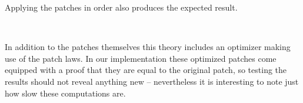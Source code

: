 Applying the patches in order also produces the expected result.
\begin{code}%
%
\>[2]\AgdaFunction{\AgdaUnderscore{}}\AgdaSpace{}%
\AgdaSymbol{:}\AgdaSpace{}%
\AgdaSpace{}%
\AgdaSpace{}%
\AgdaSymbol{(}\AgdaSpace{}%
\AgdaSpace{}%
\AgdaSymbol{)}\AgdaSpace{}%
\AgdaSpace{}%
\AgdaSpace{}%
\AgdaSpace{}%
\AgdaSpace{}%
\AgdaSpace{}%
\AgdaInductiveConstructor{[]}\<%
\\
%
\>[2]\AgdaSymbol{\AgdaUnderscore{}}\AgdaSpace{}%
\AgdaSymbol{=}\AgdaSpace{}%
\AgdaSpace{}%
\AgdaSymbol{(}\AgdaSpace{}%
\AgdaSymbol{)}\AgdaSpace{}%
\AgdaSymbol{(}\AgdaSpace{}%
\AgdaSymbol{(}\AgdaSpace{}%
\AgdaSpace{}%
\AgdaSpace{}%
\AgdaSpace{}%
\AgdaInductiveConstructor{[]}\AgdaSymbol{))}\AgdaSpace{}%
\AgdaSpace{}%
\AgdaSpace{}%
\AgdaSymbol{\AgdaUnderscore{}}\<%
\end{code}

In addition to the patches themselves this theory includes an optimizer
making use of the patch laws. In our implementation these optimized patches come equipped
with a proof that they are equal to the original patch, so testing the results should not reveal
anything new -- nevertheless it is interesting to note just how slow these computations are.

